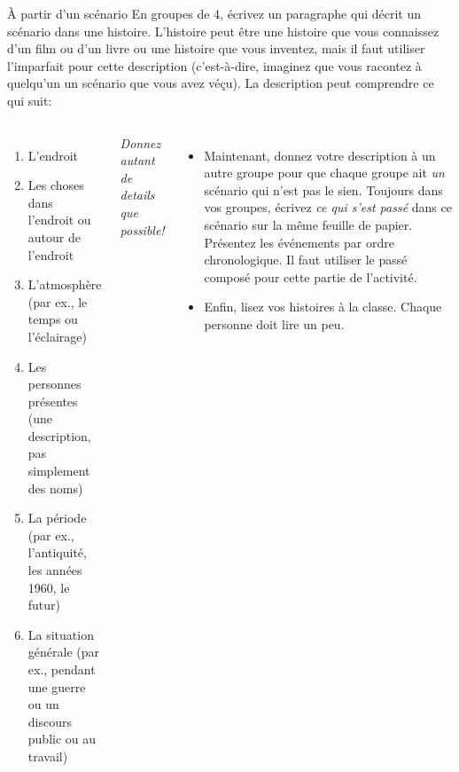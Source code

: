 \begin{frame}{À partir d'un scénario}
  \scriptsize
  En groupes de 4, écrivez un paragraphe qui décrit un scénario dans une histoire.
  L'histoire peut être une histoire que vous connaissez d'un film ou d'un livre ou une histoire que vous inventez, mais \alert{il faut utiliser l'imparfait} pour cette description (c'est-à-dire, imaginez que vous racontez à quelqu'un un scénario que vous avez véçu).
  La description peut comprendre ce qui suit:
  \begin{columns}
      \begin{enumerate}
        \item L'endroit
        \item Les choses dans l'endroit ou autour de l'endroit
        \item L'atmosphère (par ex., le temps ou l'éclairage)
        \item Les personnes présentes (une description, pas simplement des noms)
        \item La période (par ex., l'antiquité, les années 1960, le futur)
        \item La situation générale (par ex., pendant une guerre ou un discours public ou au travail)
      \end{enumerate}
      \emph{Donnez autant de details que possible!}
      \begin{itemize}
        \item<2-> Maintenant, donnez votre description à un autre groupe pour que chaque groupe ait \emph{un} scénario qui n'est pas le sien.
          Toujours dans vos groupes, écrivez \emph{ce qui s'est passé} dans ce scénario sur la même feuille de papier.
          Présentez les événements par ordre chronologique.
          \alert{Il faut utiliser le passé composé} pour cette partie de l'activité.
        \item<3-> Enfin, lisez vos histoires à la classe.
          Chaque personne doit lire un peu.
      \end{itemize}
  \end{columns}
\end{frame}